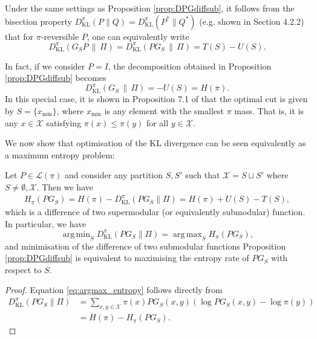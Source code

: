 \documentclass[EJP]{ejpecp} %
\DeclareMathOperator*{\argmin}{arg\,min}
\DeclareMathOperator*{\argmax}{arg\,max}
\begin{document}
\begin{corollary}
    Under the same settings as Proposition \ref{prop:DPGdiffsub}, it follows from the bisection property $D_{\mathrm{KL}}^\pi(P \| Q) = D_{\mathrm{KL}}^\pi(P^* \| Q^*)$ (e.g. shown in \cite{wolfer_2023} Section 4.2.2) that for $\pi$-reversible $P$, one can equivalently write
    $$D_{\mathrm{KL}}^\pi(G_SP \,\|\, \Pi) =  D_{\mathrm{KL}}^\pi(PG_S \,\|\, \Pi) = T(S) - U(S).$$
\end{corollary} 

In fact, if we consider $P = I$, the decomposition obtained in Proposition \ref{prop:DPGdiffsub} becomes
$$D_{\mathrm{KL}}^\pi(G_S \,\|\, \Pi) = - U(S) = H(\overline{\pi}).$$
In this special case, it is shown in Proposition 7.1 of \cite{GPG} that the optimal cut is given by $S = \{x_{\min}\}$, where $x_{\min}$ is any element with the smallest $\pi$ mass. That is, it is any $x \in \mathcal{X}$ satisfying $\pi(x) \leq \pi(y)$ for all $y \in \mathcal{X}$.

We now show that optimisation of the KL divergence can be seen equivalently as a maximum entropy problem: 

\begin{proposition}\label{prop:entropyPG_S}
    Let $P\in \mathcal{L}(\pi)$ and consider any partition $S,S'$ such that $\mathcal{X} = S \sqcup S'$ where $S \neq \emptyset,\mathcal{X}$. Then we have
    \begin{align*}
        H_\pi(P G_S) = H(\pi) - D_{\mathrm{KL}}^\pi(PG_S \| \Pi) = H(\pi) + U(S) - T(S),
    \end{align*}
    which is a difference of two supermodular (or equivalently submodular) function. In particular, we have
    \begin{equation} \label{eq:argmax_entropy}
        \argmin_S D_{\mathrm{KL}}^\pi(PG_S \| \Pi) = \argmax_S H_\pi(PG_S),
    \end{equation}
    and minimisation of the difference of two submodular functions Proposition \ref{prop:DPGdiffsub} is equivalent to maximising the entropy rate of $PG_S$ with respect to $S$.
\end{proposition}

\begin{proof}
    Equation \eqref{eq:argmax_entropy} follows directly from 
    \begin{align*}
        D_{\mathrm{KL}}^\pi(PG_S \| \Pi) &= \sum_{x,y \in \mathcal{X}} \pi(x) PG_S(x,y)(\log PG_S(x,y) - \log \pi(y))\\
        &= H(\pi) - H_\pi(PG_S).
    \end{align*}
\end{proof}
\end{document}
